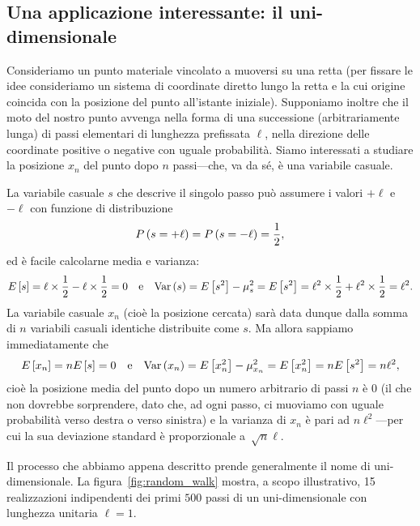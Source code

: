 \subsection{Una applicazione interessante: il  uni-dimensionale}
\label{sec:random_walk}

\danger%
Consideriamo un punto materiale vincolato a muoversi su una retta (per fissare
le idee consideriamo un sistema di coordinate diretto lungo la retta e la cui
origine coincida con la posizione del punto all'istante iniziale). Supponiamo
inoltre che il moto del nostro punto avvenga nella forma di una successione
(arbitrariamente lunga) di passi elementari di lunghezza prefissata
$\ell$, nella direzione delle coordinate positive o negative con uguale
probabilità. Siamo interessati a studiare la posizione $x_n$ del punto dopo
$n$ passi---che, va da sé, è una variabile casuale.

La variabile casuale $s$ che descrive il singolo passo può assumere i valori
$+\ell$ e $-\ell$ con funzione di distribuzione
\begin{align}
  \displaystyle P\left(s = +\ell\right) = \displaystyle P\left(s = -\ell\right) = \frac{1}{2},
\end{align}
ed è facile calcolarne media e varianza:
\begin{align*}
  \displaystyle E\left[s\right] = \ell \times \frac{1}{2} - \ell \times \frac{1}{2} = 0
  \quad \text{e} \quad
  \text{Var}\left(s\right) = \displaystyle E\left[s^2\right] - \mu_s^2 = \displaystyle E\left[s^2\right] =
  \ell^2 \times \frac{1}{2} + \ell^2 \times \frac{1}{2} = \ell^2.
\end{align*}
La variabile casuale $x_n$ (cioè la posizione cercata) sarà data dunque
dalla somma di $n$ variabili casuali identiche distribuite come $s$. Ma allora
sappiamo immediatamente che
\begin{align}\label{eq:media_varianza_random_walk}
  \displaystyle E\left[x_n\right] = n \displaystyle E\left[s\right] = 0 \quad \text{e} \quad
  \text{Var}\left(x_n\right) = \displaystyle E\left[x_n^2\right] - \mu_{x_n}^2 = \displaystyle E\left[x_n^2\right] =
  n \displaystyle E\left[s^2\right] = n\ell^2,
\end{align}
cioè la posizione media del punto dopo un numero arbitrario di passi $n$ è
$0$ (il che non dovrebbe sorprendere, dato che, ad ogni passo, ci muoviamo con
uguale probabilità verso destra o verso sinistra) e la varianza di $x_n$ è
pari ad $n\ell^2$---per cui la sua deviazione standard è proporzionale
a~$\sqrt{n}\ell$.

Il processo che abbiamo appena descritto prende generalmente il nome di
 uni-dimensionale. La figura~\ref{fig:random_walk} mostra, a
scopo illustrativo, 15 realizzazioni indipendenti dei primi $500$ passi di un
 uni-dimensionale con lunghezza unitaria $\ell = 1$.

